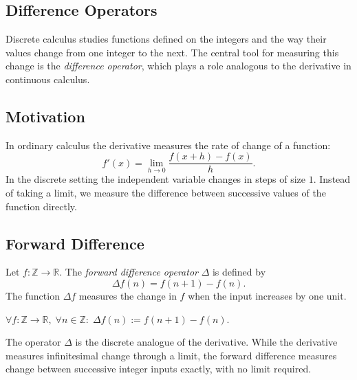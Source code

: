 
\subsection{Difference Operators}
\label{sec:difference-operators}

Discrete calculus studies functions defined on the integers and the way
their values change from one integer to the next. The central tool for
measuring this change is the \emph{difference operator}, which plays a role
analogous to the derivative in continuous calculus.

\subsection*{Motivation}

In ordinary calculus the derivative measures the rate of change of a function:
\[
f'(x) = \lim_{h\to 0} \frac{f(x+h)-f(x)}{h}.
\]
In the discrete setting the independent variable changes in steps of size
\(1\). Instead of taking a limit, we measure the difference between
successive values of the function directly.

\subsection*{Forward Difference}

\begin{definition}
\label{def:forward-difference}
Let \(f : \mathbb{Z} \to \mathbb{R}\).
The \emph{forward difference operator} \(\Delta\) is defined by
\[
\Delta f(n) = f(n+1) - f(n).
\]
The function \(\Delta f\) measures the change in \(f\) when the input
increases by one unit.
\end{definition}

\NoLocalDependencies

\begin{remark*}
\(\forall f : \mathbb{Z}\to\mathbb{R},\; \forall n \in \mathbb{Z}:\;
\Delta f(n) := f(n+1) - f(n)\).
\end{remark*}

\begin{remark*}
The operator \(\Delta\) is the discrete analogue of the derivative.
While the derivative measures infinitesimal change through a limit,
the forward difference measures change between successive integer inputs
exactly, with no limit required.
\end{remark*}

